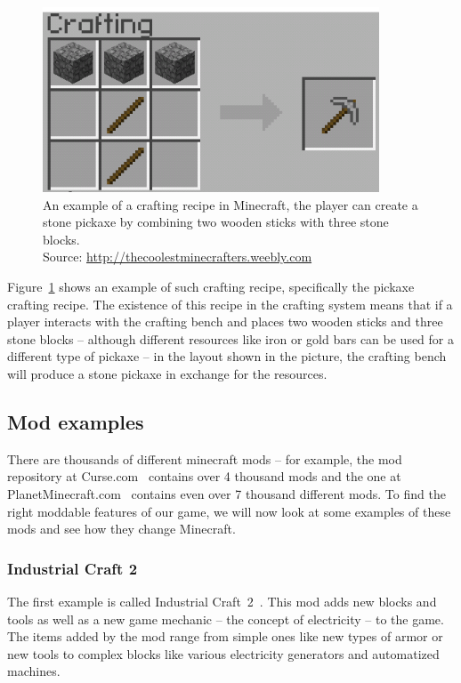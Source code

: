 \begin{figure}[h]
    \centering
    \includegraphics[width=10cm]{../img/MCCrafting.png}
    \caption{An example of a crafting recipe in Minecraft, the player can create a stone pickaxe by combining two wooden sticks
             with three stone blocks.
             \\Source: \href{http://thecoolestminecrafters.weebly.com/uploads/2/6/3/1/26317386/912472788.png}{http://thecoolestminecrafters.weebly.com}}
    \label{minecraft-crafting}
\end{figure}

Figure~\ref{minecraft-crafting} shows an example of such crafting recipe, specifically the pickaxe crafting
recipe. The existence of this recipe in the crafting system means that if a player interacts with the crafting bench and places
two wooden sticks and three stone blocks -- although different resources like iron or gold bars can be used for a different type
of pickaxe -- in the layout shown in the picture, the crafting bench will produce a stone pickaxe in exchange for the resources.

\subsection{Mod examples}

There are thousands of different minecraft mods -- for example, the mod repository at Curse.com~\cite{CurseMods} contains
over 4 thousand mods and the one at PlanetMinecraft.com~\cite{PlanetMinecraftMods} contains even over 7 thousand different mods.
To find the right moddable features of our game, we will now look at some examples of these mods and see how they change Minecraft.

\subsubsection{Industrial Craft 2}

The first example is called Industrial Craft~2~\cite{IndustrialCraft}. This mod adds new blocks and tools as well as a new game mechanic
-- the concept of electricity -- to the game. The items added by the mod range from simple ones like new types of armor or
new tools to complex blocks like various electricity generators and automatized machines.

